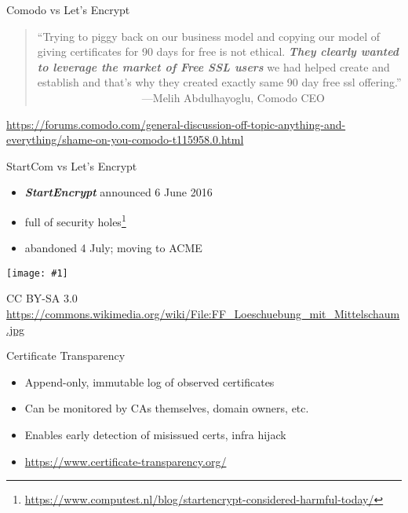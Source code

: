 \documentclass[ignorenonframetext,aspectratio=169]{beamer}
\makeatletter
\def\maxwidth{\ifdim\Gin@nat@width>\linewidth\linewidth\else\Gin@nat@width\fi}
\def\maxheight{\ifdim\Gin@nat@height>\textheight0.8\textheight\else\Gin@nat@height\fi}
\newcommand{\includegraphicsscaled}[1]{
    \texttt{[image: \#1]}
}
\makeatother
\begin{document}
\begin{frame}{Comodo vs Let's Encrypt}
\large
\begin{quote}
  ``Trying to piggy back on our business model and copying our model
  of giving certificates for 90 days for free is not ethical.
  {\bf \em They
  clearly wanted to leverage the market of Free SSL users} we had
  helped create and establish and that's why they created exactly
  same 90 day free ssl offering.''\\
  ~~~~~~~~~~~~~~~~~~~---Melih Abdulhayoglu, Comodo CEO
\end{quote}

\bigskip

\tiny

\url{https://forums.comodo.com/general-discussion-off-topic-anything-and-everything/shame-on-you-comodo-t115958.0.html}

\end{frame}

\begin{frame}{StartCom vs Let's Encrypt}

\begin{itemize}
\item
  \textbf{\emph{StartEncrypt}} announced 6 June 2016
\item
  full of security holes\footnote{
    \url{https://www.computest.nl/blog/startencrypt-considered-harmful-today/}}
\item
  abandoned 4 July; moving to ACME
\end{itemize}

\end{frame}

\begin{frame}[plain]

\begin{center}
\includegraphicsscaled{FF_Loeschuebung_mit_Mittelschaum.jpg}
\end{center}

\tiny

CC BY-SA 3.0
\url{https://commons.wikimedia.org/wiki/File:FF_Loeschuebung_mit_Mittelschaum.jpg}

\end{frame}

\begin{frame}{Certificate Transparency}

\begin{itemize}
\item
  Append-only, immutable log of observed certificates
\item
  Can be monitored by CAs themselves, domain owners, etc.
\item
  Enables early detection of misissued certs, infra hijack
\item
  \url{https://www.certificate-transparency.org/}
\end{itemize}

\end{frame}
\end{document}

